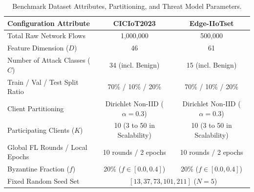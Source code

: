 \begin{table}[t]
\centering
\small
\caption{Benchmark Dataset Attributes, Partitioning, and Threat Model Parameters.}
\label{tab:experimental_setup}
\begin{tabular}{lcc}
\toprule
\textbf{Configuration Attribute} & \textbf{CICIoT2023} & \textbf{Edge-IIoTset} \\
\midrule
Total Raw Network Flows & 1,000,000 & 500,000 \\
Feature Dimension ($D$) & 46 & 61 \\
Number of Attack Classes ($C$) & 34 (incl. Benign) & 15 (incl. Benign) \\
Train / Val / Test Split Ratio & 70\% / 10\% / 20\% & 70\% / 10\% / 20\% \\
Client Partitioning & Dirichlet Non-IID ($\alpha = 0.3$) & Dirichlet Non-IID ($\alpha = 0.3$) \\
Participating Clients ($K$) & 10 (3 to 50 in Scalability) & 10 (3 to 50 in Scalability) \\
Global FL Rounds / Local Epochs & 10 rounds / 2 epochs & 10 rounds / 2 epochs \\
Byzantine Fraction ($f$) & 20\% ($f \in [0.0, 0.4]$) & 20\% ($f \in [0.0, 0.4]$) \\
Fixed Random Seed Set & \multicolumn{2}{c}{$[13, 37, 73, 101, 211]$ ($N=5$)} \\
\bottomrule
\end{tabular}
\end{table}

